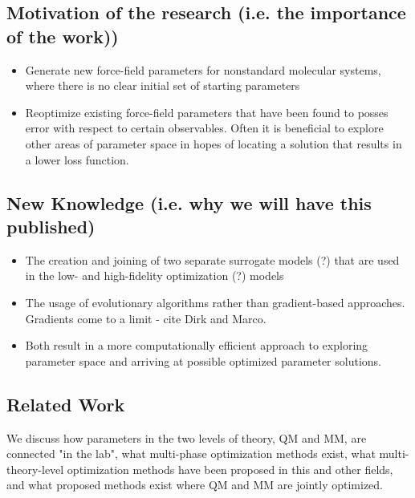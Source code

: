 \documentclass[preprint,12pt]{elsarticle}
\begin{document}
\subsection{Motivation of the research (i.e. the importance of the work))}
\begin{itemize}
    \item Generate new force-field parameters for nonstandard molecular systems, where there is no clear initial set of starting parameters
    \item Reoptimize existing force-field parameters that have been found to posses error with respect to certain observables. Often it is beneficial to explore other areas of parameter space in hopes of locating a solution that results in a lower loss function.
\end{itemize}

\subsection{New Knowledge (i.e. why we will have this published)}
\begin{itemize}
    \item The creation and joining of two separate surrogate models (?) that are used in the low- and high-fidelity optimization (?) models
    \item The usage of evolutionary algorithms rather than gradient-based approaches. Gradients come to a limit - cite Dirk and Marco.
    \item Both result in a more computationally efficient approach to exploring parameter space and arriving at possible optimized parameter solutions.
\end{itemize}

\subsection{Related Work}
We discuss how parameters in the two levels of theory, QM and MM, are connected "in the lab", what multi-phase optimization methods exist, what multi-theory-level optimization methods have been proposed in this and other fields, and what proposed methods exist where QM and MM are jointly optimized.
\end{document}
